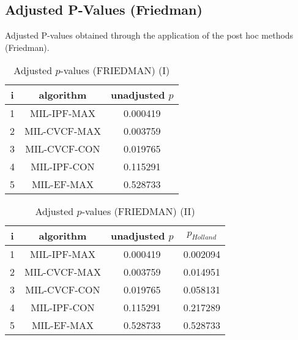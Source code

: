\documentclass[a4paper,10pt]{article}
\begin{document}
\begin{landscape}
\newpage

\section{Adjusted P-Values (Friedman)}


Adjusted P-values obtained through the application of the post hoc methods (Friedman).

\begin{table}[!htp]
\centering\small
\begin{tabular}{ccc}
i&algorithm&unadjusted $p$\\
\hline1&MIL-IPF-MAX&0.000419\\2&MIL-CVCF-MAX&0.003759\\3&MIL-CVCF-CON&0.019765\\4&MIL-IPF-CON&0.115291\\5&MIL-EF-MAX&0.528733\\\hline
\end{tabular}
\caption{Adjusted $p$-values (FRIEDMAN) (I)}
\end{table}
\begin{table}[!htp]
\centering\small
\begin{tabular}{cccc}
i&algorithm&unadjusted $p$&$p_{Holland}$\\
\hline1&MIL-IPF-MAX&0.000419&0.002094\\2&MIL-CVCF-MAX&0.003759&0.014951\\3&MIL-CVCF-CON&0.019765&0.058131\\4&MIL-IPF-CON&0.115291&0.217289\\5&MIL-EF-MAX&0.528733&0.528733\\\hline
\end{tabular}
\caption{Adjusted $p$-values (FRIEDMAN) (II)}
\end{table}

\newpage
\end{landscape}
\end{document}

